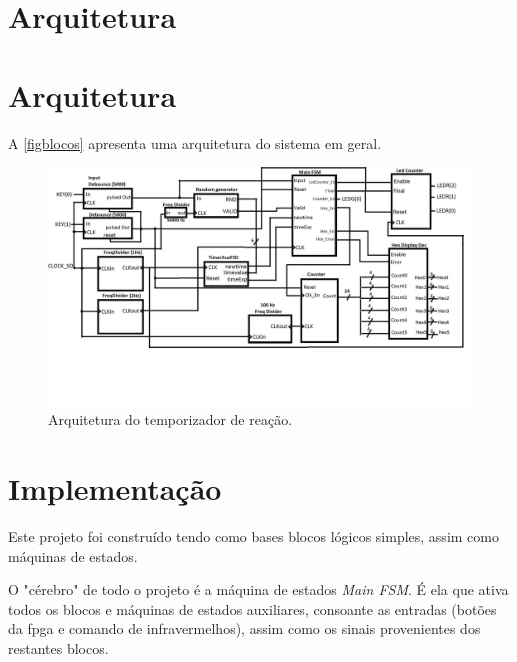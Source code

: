 \documentclass[a4paper,11pt,onecolumn]{report}
\begin{document}
\section{Arquitetura}

\section{Arquitetura}
A \autoref{figblocos} apresenta uma arquitetura do sistema em geral.

\begin{figure}[h]
\centerline{\includegraphics[scale=0.25]{Images/BlockDiagram}}
\caption{Arquitetura do temporizador de reação.}
\label{figblocos}
\end{figure}

\pagebreak

\section{Implementação}

Este projeto foi construído tendo como bases blocos lógicos simples, assim como máquinas de estados.

O "cérebro" de todo o projeto é a máquina de estados \textit{Main FSM}. É ela que ativa todos os blocos e máquinas de estados auxiliares, consoante as entradas (botões da \ac{fpga} e comando de infravermelhos), assim como os sinais provenientes dos restantes blocos.
\end{document}
